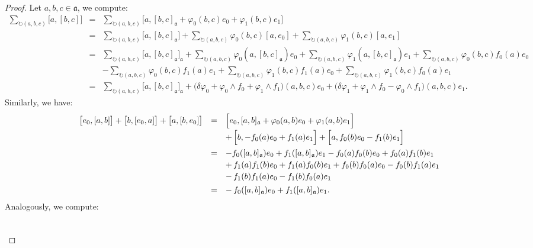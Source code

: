 \documentclass[final,1p,times,nopreprintline]{elsarticle}
\theoremstyle{definition}
\numberwithin{equation}{section}
\newcommand{\ai}{\mathfrak{a}}
\numberwithin{equation}{section}
\begin{document}
\begin{proof}
	Let $a,b,c\in\ai$, we compute:
	\begin{eqnarray*}
		\sum_{\circlearrowright (a,b,c)} \big[a,[b,c]\big]&=&\sum_{\circlearrowright (a,b,c)} \Big[a,[b,c]_\ai+\varphi_0(b,c)e_0+\varphi_1(b,c)e_1\Big]\\
		&=&\sum_{\circlearrowright (a,b,c)} \big[a,[b,c]_\ai\big]+\sum_{\circlearrowright (a,b,c)} \varphi_0(b,c)[a,e_0]+\sum_{\circlearrowright (a,b,c)} \varphi_1(b,c)[a,e_1]\\
		&=&\sum_{\circlearrowright (a,b,c)} \big[a,[b,c]_\ai\big]_\ai+\sum_{\circlearrowright (a,b,c)} \varphi_0(a,[b,c]_\ai)e_0+\sum_{\circlearrowright (a,b,c)} \varphi_1(a,[b,c]_\ai)e_1+\sum_{\circlearrowright (a,b,c)}\varphi_0(b,c)f_0(a)e_0\\
		&&-\sum_{\circlearrowright (a,b,c)}\varphi_0(b,c)f_1(a)e_1+\sum_{\circlearrowright (a,b,c)}\varphi_1(b,c)f_1(a)e_0+\sum_{\circlearrowright (a,b,c)}\varphi_1(b,c)f_0(a)e_1\\
		&=&\sum_{\circlearrowright (a,b,c)} \big[a,[b,c]_\ai\big]_\ai+\big(\delta\varphi_0+\varphi_0\wedge f_0+\varphi_1\wedge f_1\big)(a,b,c)e_0+\big(\delta\varphi_1+\varphi_1\wedge f_0-\varphi_0\wedge f_1\big)(a,b,c)e_1.
	\end{eqnarray*}
	Similarly, we have:
	\begin{equation*}
\begin{array}{r c l}\vspace{0.75mm}
\big[e_0,[a,b]\big]+\big[b,[e_0,a]\big]+\big[a,[b,e_0]\big]&=&\Big[e_0,[a,b]_\ai+\varphi_0(a,b)e_0+\varphi_1(a,b)e_1\Big]\\\vspace{1.5mm}
		&&+\,\Big[b,-f_0(a)e_0+f_1(a)e_1\Big]+\Big[a,f_0(b)e_0-f_1(b)e_1\Big]\\\vspace{0.75mm}
		&=&-f_0([a,b]_\ai)e_0+f_1([a,b]_\ai)e_1-f_0(a)f_0(b)e_0+f_0(a)f_1(b)e_1\\\vspace{0.75mm}
		&&+\,f_1(a)f_1(b)e_0+f_1(a)f_0(b)e_1+f_0(b)f_0(a)e_0-f_0(b)f_1(a)e_1\\\vspace{1.5mm}
		&&-\,f_1(b)f_1(a)e_0-f_1(b)f_0(a)e_1\\
		&=&-\,f_0([a,b]_\ai)e_0+f_1([a,b]_\ai)e_1.
	\end{array}
\end{equation*}
	Analogously, we compute:
	\begin{equation*}
		\begin{array}{r c l}\vspace{0.75mm}

\end{array}
\end{equation*}
\end{proof}
\end{document}
